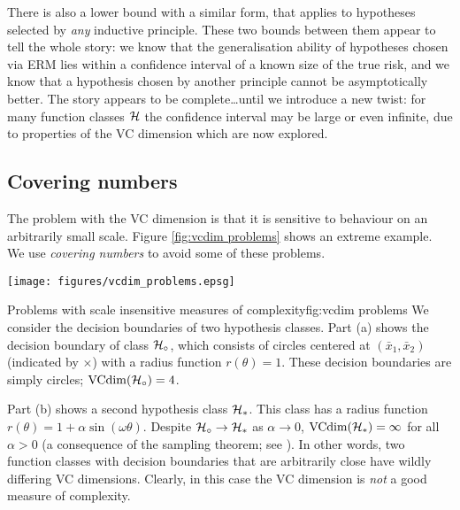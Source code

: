 There is also a lower bound with a similar form, that applies to
hypotheses selected by \emph{any} inductive principle.  These two
bounds between them appear to tell the whole story: we know that the
generalisation ability of hypotheses chosen via ERM lies within a
confidence interval of a known size of the true risk, and we know that
a hypothesis chosen by another principle cannot be asymptotically
better.  The story appears to be complete\ldots until we introduce a
new twist: for many function classes $\mathcal{H}$ the confidence interval
may be large or even infinite, due to properties of the VC dimension
which are now explored. 

\subsection{Covering numbers}
\label{sec:covering numbers}

The problem with the VC dimension is that it is sensitive to behaviour
on an arbitrarily small scale.  Figure \ref{fig:vcdim problems} shows
an extreme example.  We use \emph{covering numbers} to avoid some of
these problems.\enlargethispage{10pt}

\begin{linefigure}
\begin{center}
\texttt{[image: figures/vcdim\_problems.epsg]}
\end{center}
\begin{capt}{Problems with scale insensitive measures of
complexity}{fig:vcdim problems}
We consider the decision boundaries of two hypothesis classes.  Part
(a) shows the decision boundary of class $\mathcal{H}_{\circ}$,
which consists of circles centered at $(\bar{x}_1, \bar{x}_2)$
(indicated by $\times$) with a radius function $r(\theta) = 1$.  These
decision boundaries are simply circles; $\mathrm{VCdim}(\mathcal{H}_{\circ}) = 4$.

Part (b) shows a second hypothesis class $\mathcal{H}_{\ast}$.  This class
has a radius function $r(\theta) = 1 + \alpha \sin(\omega \theta)$.
Despite $\mathcal{H}_{\circ} \rightarrow \mathcal{H}_{\ast}$ as $\alpha
\rightarrow 0$, $\mathrm{VCdim}(\mathcal{H}_{\ast}) = \infty$ for all $\alpha >
0$ (a consequence of the sampling theorem; see \cite{Cherkassky98}).
In other words, two function classes with 
decision boundaries that are arbitrarily close have wildly differing
VC dimensions.  Clearly, in this case the VC dimension is \emph{not} a
good measure of complexity.
\end{capt}
\end{linefigure}

